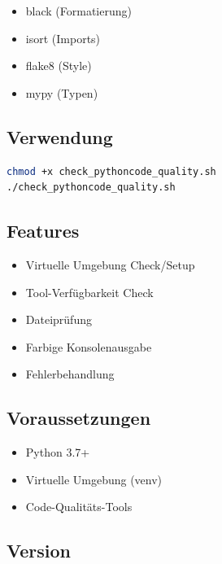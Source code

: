 \documentclass{vorlage-design-main}
\begin{document}
\begin{itemize}

\item
  black (Formatierung)
\item
  isort (Imports)
\item
  flake8 (Style)
\item
  mypy (Typen)
\end{itemize}

\subsection{Verwendung}\label{verwendung-2}

\begin{lstlisting}[language=bash]
chmod +x check_pythoncode_quality.sh
./check_pythoncode_quality.sh
\end{lstlisting}

\subsection{Features}\label{features-1}

\begin{itemize}

\item
  Virtuelle Umgebung Check/Setup
\item
  Tool-Verfügbarkeit Check
\item
  Dateiprüfung
\item
  Farbige Konsolenausgabe
\item
  Fehlerbehandlung
\end{itemize}

\subsection{Voraussetzungen}\label{voraussetzungen-2}

\begin{itemize}

\item
  Python 3.7+
\item
  Virtuelle Umgebung (venv)
\item
  Code-Qualitäts-Tools
\end{itemize}

\subsection{Version}\label{version-1}
\end{document}
